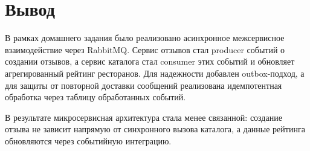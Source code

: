 \documentclass[14pt,a4paper]{extarticle}
\begin{document}
\section{Вывод}

В рамках домашнего задания было реализовано асинхронное межсервисное взаимодействие через RabbitMQ. Сервис отзывов стал producer событий о создании отзывов, а сервис каталога стал consumer этих событий и обновляет агрегированный рейтинг ресторанов. Для надежности добавлен outbox-подход, а для защиты от повторной доставки сообщений реализована идемпотентная обработка через таблицу обработанных событий.

В результате микросервисная архитектура стала менее связанной: создание отзыва не зависит напрямую от синхронного вызова каталога, а данные рейтинга обновляются через событийную интеграцию.
\end{document}
